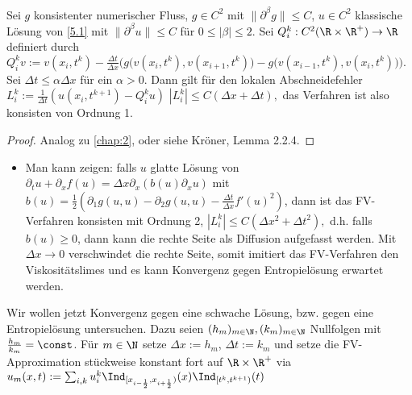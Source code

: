 \begin{st}[Konsistenz] \label{5.11}
    Sei $g$ konsistenter numerischer Fluss, $g \in C^2$ mit $\|\partial^\beta g\| \le C$, $u \in C^2$ klassische Lösung von \eqref{5.1} mit $\|\partial^\beta u\| \le C$ für $0 \le |\beta| \le 2$.
    Sei $Q_i^k: C^2(\R \times \R^+) \to \R$ definiert durch
    \begin{math}
        Q_i^k v := v(x_i, t^k) - \frac{\Delta t}{\Delta x} \Big(g\big(v(x_i,t^k), v(x_{i+1}, t^k)\big) - g\big(v(x_{i-1}, t^k), v(x_i, t^k)\big)\Big).
    \end{math}
    Sei $\Delta t \le \alpha \Delta x$ für ein $\alpha > 0$.
    Dann gilt für den lokalen Abschneidefehler $L_i^k := \frac{1}{\Delta t} (u(x_i, t^{k+1}) - Q_i^k u)$
    \begin{math}
        |L_i^k| \le C (\Delta x + \Delta t),
    \end{math}
    das Verfahren ist also konsisten von Ordnung 1.
    \begin{proof}
        Analog zu \ref{chap:2}, oder siehe Kröner, Lemma 2.2.4.
    \end{proof}
    \begin{note}
        \begin{itemize}
            \item
                Man kann zeigen: falls $u$ glatte Lösung von
                \begin{math}
                    \partial_t u + \partial_x f(u) = \Delta x \partial_x (b(u) \partial_x u)
                \end{math}
                mit $b(u) = \frac{1}{2} (\partial_1 g(u,u) - \partial_2 g(u,u) - \frac{\Delta t}{\Delta x} f'(u)^2)$, dann ist das FV-Verfahren konsisten mit Ordnung 2,
                \begin{math}
                    |L_i^k| \le C(\Delta x^2 + \Delta t^2),
                \end{math}
                d.h. falls $b(u) \ge 0$, dann kann die rechte Seite als Diffusion aufgefasst werden.
                Mit $\Delta x \to 0$ verschwindet die rechte Seite, somit imitiert das FV-Verfahren den Viskositätslimes und es kann Konvergenz gegen Entropielösung erwartet werden.
        \end{itemize}
    \end{note}
\end{st}

Wir wollen jetzt Konvergenz gegen eine schwache Lösung, bzw. gegen eine Entropielösung untersuchen.
Dazu seien $(h_m)_{m\in\N}, (k_m)_{m\in\N}$ Nullfolgen mit $\frac{h_m}{k_m} = \const$.
Für $m \in \N$ setze $\Delta x := h_m$, $\Delta t := k_m$ und setze die FV-Approximation stückweise konstant fort auf $\R \times \R^+$ via
\begin{math}
    u_m(x,t) := \sum_{i,k} u_i^k \Ind_{[x_{i-\frac{1}{2}}, x_{i+\frac{1}{2}})}(x) \Ind_{[t^k, t^{k+1})}(t)
\end{math}

